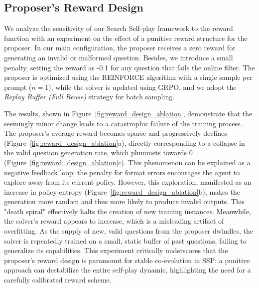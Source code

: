 \documentclass[10pt, a4paper, logo]{googledeepmind} %
\begin{document}
\subsection{Proposer's Reward Design}
We analyze the sensitivity of our Search Self-play framework to the reward function with an experiment on the effect of a punitive reward structure for the proposer. In our main configuration, the proposer receives a zero reward for generating an invalid or malformed question. Besides, we introduce a small penalty, setting the reward as -0.1 for any question that fails the online filter. The proposer is optimized using the REINFORCE algorithm with a single sample per prompt ($n=1$), while the solver is updated using GRPO, and we adopt the \textit{Replay Buffer (Full Reuse)} strategy for batch sampling.

The results, shown in Figure~\ref{fig:reward_design_ablation}, demonstrate that the seemingly minor change leads to a catastrophic failure of the training process. The proposer's average reward becomes sparse and progressively declines (Figure~\ref{fig:reward_design_ablation}a), directly corresponding to a collapse in the valid question generation rate, which plummets towards 0 (Figure~\ref{fig:reward_design_ablation}c). This phenomenon can be explained as a negative feedback loop: the penalty for format errors encourages the agent to explore away from its current policy. However, this exploration, manifested as an increase in policy entropy (Figure~\ref{fig:reward_design_ablation}b), makes the generation more random and thus more likely to produce invalid outputs. This "death spiral" effectively halts the creation of new training instances. Meanwhile, the solver's reward appears to increase, which is a misleading artifact of overfitting. As the supply of new, valid questions from the proposer dwindles, the solver is repeatedly trained on a small, static buffer of past questions, failing to generalize its capabilities. This experiment critically underscores that the proposer's reward design is paramount for stable co-evolution in SSP; a punitive approach can destabilize the entire self-play dynamic, highlighting the need for a carefully calibrated reward scheme.
\end{document}

